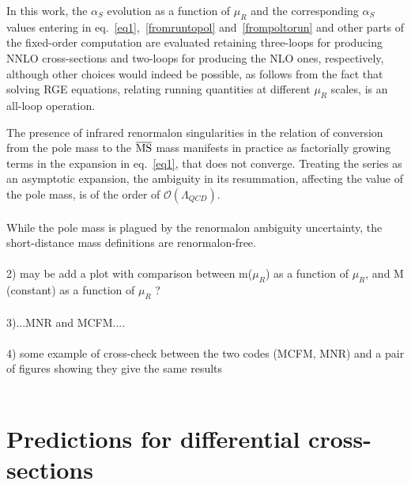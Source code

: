 \documentclass[12pt,a4paper]{article}
\begin{document}
In this work, the $\alpha_S$ evolution as a function of $\mu_R$ and the corresponding $\alpha_S$ values entering in eq.~\ref{eq1},~\ref{fromruntopol} and~\ref{frompoltorun} and other parts of the fixed-order computation are evaluated retaining three-loops for producing NNLO cross-sections and two-loops for producing the NLO ones, respectively, although other choices would indeed be possible, as follows from the fact that solving RGE equations, relating running quantities at different $\mu_R$ scales, is an all-loop operation.

The presence of infrared renormalon singularities in the relation of conversion from the pole mass to the $\overline{\rm MS}$ mass manifests in practice as factorially growing terms in the expansion in eq.~\ref{eq1}, that does not converge. 
Treating the series as an asymptotic expansion, the ambiguity in its resummation, affecting the value of the pole mass, is of the order of $\mathcal{O}(\Lambda_{QCD})$.   
\\
\\
While the pole mass is plagued by the renormalon ambiguity uncertainty, the short-distance mass definitions are renormalon-free.  
\\
\\

2) may be add a plot with comparison between m($\mu_R$) as a function of $\mu_R$, and M (constant) as a function of $\mu_R$ ? 
\\
\\

3)...MNR and MCFM....
\\
\\
4) some example of cross-check between the two codes (MCFM, MNR) and a pair of figures
showing they give the same results
\\
\\

\section{Predictions for differential cross-sections}
\label{diff}
\end{document}
